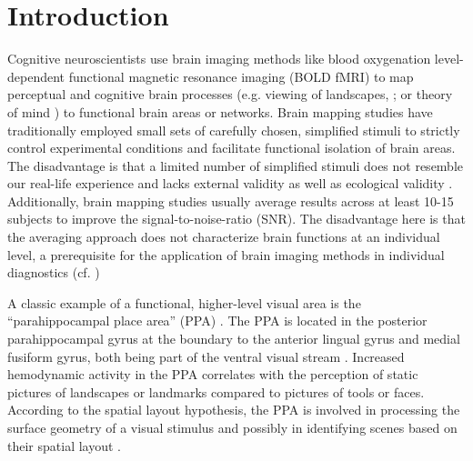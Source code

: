 \documentclass[english]{article}
\begin{document}

\section{Introduction} Cognitive neuroscientists use brain imaging methods like
blood oxygenation level-dependent functional magnetic resonance imaging (BOLD
fMRI) to map perceptual and cognitive brain processes (e.g. viewing of
landscapes, \citep{epstein1998ppa}; or theory of mind
\citep{spunt2014validating}) to functional brain areas or networks. Brain
mapping studies have traditionally employed small sets of carefully chosen,
simplified stimuli to strictly control experimental conditions and facilitate
functional isolation of brain areas. The disadvantage is that a limited number
of simplified stimuli does not resemble our real-life experience and lacks
external validity \citep{westfall2016fixing} as well as ecological validity
\citep{hasson2004intersubject}. Additionally, brain mapping studies usually
average results across at least 10-15 subjects to improve the
signal-to-noise-ratio (SNR). The disadvantage here is that the averaging
approach does not characterize brain functions at an individual level, a
prerequisite for the application of brain imaging methods in individual
diagnostics (cf. \citep{dubois2016building})


A classic example of a functional, higher-level visual area is the
``parahippocampal place area'' (PPA) \citep{epstein1998ppa,
epstein1999parahippocampal}. The PPA is located in the posterior parahippocampal
gyrus at the boundary to the anterior lingual gyrus and medial fusiform gyrus,
both being part of the ventral visual stream \citep{mishkin1982contribution,
goodale1992separate}. Increased hemodynamic activity in the PPA correlates with
the perception of static pictures of landscapes or landmarks compared to
pictures of tools or faces.  According to the spatial layout hypothesis, the PPA
is involved in processing the surface geometry of a visual stimulus and possibly
in identifying scenes based on their spatial layout \citep{epstein2010reliable}.
\end{document}

